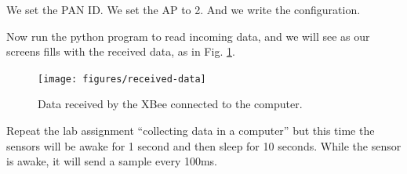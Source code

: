 We set the PAN ID.
We set the AP to 2.
And we write the configuration.

Now run the python program to read incoming data, and we will see as our screens fills with the received data, as in Fig. \ref{fig:received-data}.

\begin{figure}[htbp]
  \centering
  \texttt{[image: figures/received-data]}
  \caption{Data received by the XBee connected to the computer.}
  \label{fig:received-data}
\end{figure}


Repeat the lab assignment ``collecting data in a computer'' but this time the sensors will be awake for 1 second and then sleep for 10 seconds.
While the sensor is awake, it will send a sample every 100ms.

